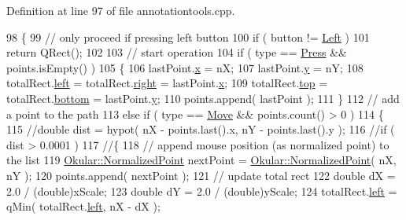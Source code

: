 Definition at line 97 of file annotationtools.\+cpp.


\begin{DoxyCode}
98 \{
99     \textcolor{comment}{// only proceed if pressing left button}
100     \textcolor{keywordflow}{if} ( button != \hyperlink{classAnnotatorEngine_ac2e3b75e12bacbb6974d15dd53954567a2719e853d63982d67e9d8aae3620178c}{Left} )
101         \textcolor{keywordflow}{return} QRect();
102 
103     \textcolor{comment}{// start operation}
104     \textcolor{keywordflow}{if} ( type == \hyperlink{classAnnotatorEngine_a00fb22eb4cb6eafb056f9066031db133a7f6f77a85d31dc6afd375db9a53d5069}{Press} && points.isEmpty() )
105     \{
106         lastPoint.\hyperlink{classOkular_1_1NormalizedPoint_a857f49b9bc7712430d167472ef9dbd94}{x} = nX;
107         lastPoint.\hyperlink{classOkular_1_1NormalizedPoint_ac2276daabda627d5f82bb1532c293047}{y} = nY;
108         totalRect.\hyperlink{classOkular_1_1NormalizedRect_a76336fe9d733f2b559cf8df3ef48f9e7}{left} = totalRect.\hyperlink{classOkular_1_1NormalizedRect_a12bbdbb865e6282c9a325b61638553f4}{right} = lastPoint.\hyperlink{classOkular_1_1NormalizedPoint_a857f49b9bc7712430d167472ef9dbd94}{x};
109         totalRect.\hyperlink{classOkular_1_1NormalizedRect_acfb70f6417c993508d50090b512cb954}{top} = totalRect.\hyperlink{classOkular_1_1NormalizedRect_a06fddfff238371f6f584360c0678741a}{bottom} = lastPoint.\hyperlink{classOkular_1_1NormalizedPoint_ac2276daabda627d5f82bb1532c293047}{y};
110         points.append( lastPoint );
111     \}
112     \textcolor{comment}{// add a point to the path}
113     \textcolor{keywordflow}{else} \textcolor{keywordflow}{if} ( type == \hyperlink{classAnnotatorEngine_a00fb22eb4cb6eafb056f9066031db133a4efcf099c4a82b1eab7de0fb124563a8}{Move} && points.count() > 0 )
114     \{
115         \textcolor{comment}{//double dist = hypot( nX - points.last().x, nY - points.last().y );}
116         \textcolor{comment}{//if ( dist > 0.0001 )}
117         \textcolor{comment}{//\{}
118             \textcolor{comment}{// append mouse position (as normalized point) to the list}
119             \hyperlink{classOkular_1_1NormalizedPoint}{Okular::NormalizedPoint} nextPoint = 
      \hyperlink{classOkular_1_1NormalizedPoint}{Okular::NormalizedPoint}( nX, nY );
120             points.append( nextPoint );
121             \textcolor{comment}{// update total rect}
122             \textcolor{keywordtype}{double} dX = 2.0 / (double)xScale;
123             \textcolor{keywordtype}{double} dY = 2.0 / (double)yScale;
124             totalRect.\hyperlink{classOkular_1_1NormalizedRect_a76336fe9d733f2b559cf8df3ef48f9e7}{left} = qMin( totalRect.\hyperlink{classOkular_1_1NormalizedRect_a76336fe9d733f2b559cf8df3ef48f9e7}{left}, nX - dX );

\end{DoxyCode}
